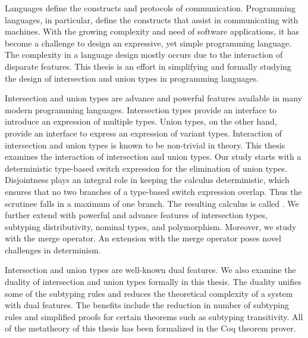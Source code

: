 %
\noindent
%


Languages define the constructs and protocols of communication.
Programming languages, in particular, define the constructs that
assist in communicating with machines. With the growing complexity
and need of software applications, it has become a challenge to
design an expressive, yet simple programming language. The complexity
in a language design mostly occurs due to the interaction of
disparate features. This thesis is an effort in simplifying and formally
studying the design of intersection and union types in
programming languages.

Intersection and union types are advance and powerful features
available in many modern programming languages. Intersection types 
provide an interface to introduce an expression of multiple types.
Union types, on the other hand, provide an interface to express an
expression of variant types. Interaction of intersection and
union types is known to be non-trivial in theory.
This thesis examines the interaction of intersection and union types.
Our study starts with a deterministic type-based switch expression
for the elimination of union types. Disjointness plays an integral
role in keeping the calculus deterministic, which ensures that no
two branches of a type-based switch expression overlap. Thus the
scrutinee falls in a maximum of one branch. The resulting calculus
is called \name. We further extend \name with powerful and advance
features of intersection types, subtyping distributivity, nominal
types, and polymorphism. Moreover, we study \name with the
merge operator. An extension with the merge operator poses
novel challenges in determinism.

Intersection and union types are well-known dual features.
We also examine 
the duality of intersection and union types formally in this thesis.
The duality unifies some of the subtyping rules and reduces the theoretical complexity
of a system with dual features.
The benefits include the reduction in number of subtyping rules and simplified proofs
for certain theorems such as subtyping transitivity. 
All of the metatheory of this thesis has been
formalized in the Coq theorem prover.

